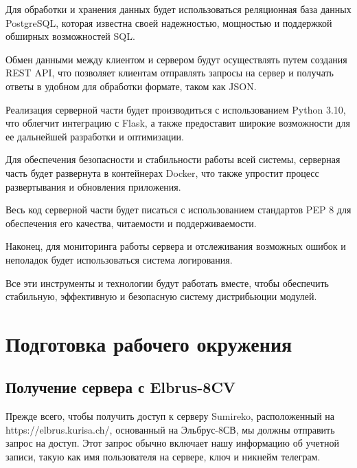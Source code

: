 Для обработки и хранения данных будет использоваться реляционная база данных PostgreSQL, которая известна своей надежностью, мощностью и поддержкой обширных возможностей SQL. 

Обмен данными между клиентом и сервером будут осуществлять путем создания REST API, что позволяет клиентам отправлять запросы на сервер и получать ответы в удобном для обработки формате, таком как JSON.

Реализация серверной части будет производиться с использованием Python 3.10, что облегчит интеграцию с Flask, а также предоставит широкие возможности для ее дальнейшей разработки и оптимизации.

Для обеспечения безопасности и стабильности работы всей системы, серверная часть будет развернута в контейнерах Docker, что также упростит процесс развертывания и обновления приложения.

Весь код серверной части будет писаться с использованием стандартов PEP 8 \cite{dev:pep} для обеспечения его качества, читаемости и поддерживаемости. 



Наконец, для мониторинга работы сервера и отслеживания возможных ошибок и неполадок будет использоваться система логирования. 

Все эти инструменты и технологии будут работать вместе, чтобы обеспечить стабильную, эффективную и безопасную систему дистрибьюции модулей.

\section{Подготовка рабочего окружения}

\subsection{Получение сервера с Elbrus-8CV}

Прежде всего, чтобы получить доступ к серверу Sumireko, расположенный на https://elbrus.kurisa.ch/, основанный на Эльбрус-8СВ, мы должны отправить запрос на доступ. Этот запрос обычно включает нашу информацию об учетной записи, такую как имя пользователя на сервере, ключ и никнейм телеграм.

